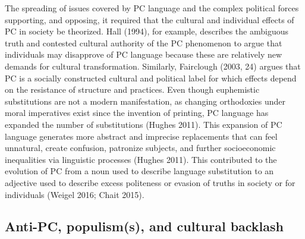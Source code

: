 \documentclass[smallextended]{svjour3}       %
\begin{document}
The spreading of issues covered by PC language and the complex political
forces supporting, and opposing, it required that the cultural and
individual effects of PC in society be theorized. Hall (1994), for
example, describes the ambiguous truth and contested cultural authority
of the PC phenomenon to argue that individuals may disapprove of PC
language because these are relatively new demands for cultural
transformation. Similarly, Fairclough (2003, 24) argues that PC is a
socially constructed cultural and political label for which effects
depend on the resistance of structure and practices. Even though
euphemistic substitutions are not a modern manifestation, as changing
orthodoxies under moral imperatives exist since the invention of
printing, PC language has expanded the number of substitutions (Hughes
2011). This expansion of PC language generates more abstract and
imprecise replacements that can feel unnatural, create confusion,
patronize subjects, and further socioeconomic inequalities via
linguistic processes (Hughes 2011). This contributed to the evolution of
PC from a noun used to describe language substitution to an adjective
used to describe excess politeness or evasion of truths in society or
for individuals (Weigel 2016; Chait 2015).

\hypertarget{anti-pc-populisms-and-cultural-backlash}{%
\subsection{Anti-PC, populism(s), and cultural
backlash}\label{anti-pc-populisms-and-cultural-backlash}}
\end{document}
